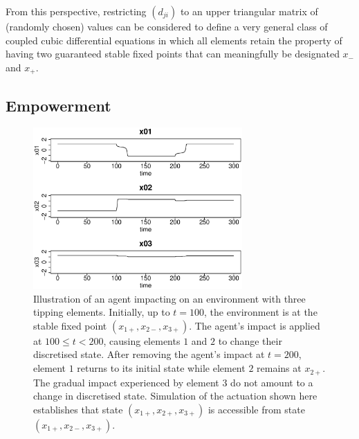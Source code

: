 \documentclass[conference]{IEEEtran}
\newcommand{\couplingconstant}{\ensuremath{d}}
\begin{document}
From this perspective, restricting $(\couplingconstant_{ji})$ to an upper triangular
matrix of (randomly chosen) values can be considered to define a very
general class of coupled cubic differential equations in which all
elements retain the property of having two guaranteed stable fixed
points that can meaningfully be designated $x_{-}$ and $x_{+}$.


\subsection{Empowerment}
\label{section_empowerment}

\begin{figure}

  \centerline{\includegraphics[width=8cm]{agentimpact_ode.eps}}

  \caption{Illustration of an agent impacting on an environment with
    three tipping elements. Initially, up to $t = 100$, the
    environment is at the stable fixed point
    $(x_{1+}, x_{2-}, x_{3+})$. The agent's impact is applied at
    $100 \le t < 200$, causing elements $1$ and $2$ to change their
    discretised state. After removing the agent's impact at $t = 200$,
    element $1$ returns to its initial state while element $2$ remains
    at $x_{2+}$. The gradual impact experienced by element $3$ do not
    amount to a change in discretised state. Simulation of the
    actuation shown here establishes that state
    $(x_{1+}, x_{2+}, x_{3+})$ is accessible from state
    $(x_{1+}, x_{2-}, x_{3+})$.}
  \label{fig_agentimpact}
\end{figure}


\end{document}
